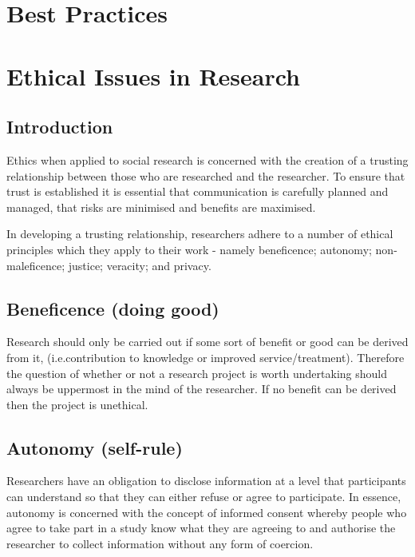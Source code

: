 \section{Best Practices}

\section{Ethical Issues in Research}

\subsection{Introduction}

Ethics when applied to social research is concerned with the creation of a trusting relationship between those who are researched and the researcher. To ensure that trust is established it is essential that communication is carefully planned and managed, that risks are minimised and benefits are maximised.\cite{kirklees2019ethical}

In developing a trusting relationship, researchers adhere to a number of ethical principles which they apply to their work - namely beneficence; autonomy; non-maleficence; justice; veracity; and privacy.

\subsection{Beneficence (doing good)}

Research should only be carried out if some sort of benefit or good can be derived from it, (i.e.contribution to knowledge or improved service/treatment). Therefore the question of whether or not a research project is worth undertaking should always be uppermost in the mind of the researcher. If no benefit can be derived then the project is unethical.

\subsection{Autonomy (self-rule)}

Researchers have an obligation to disclose information at a level that participants can understand so that they can either refuse or agree to participate. In essence, autonomy is concerned with the concept of informed consent whereby people who agree to take part in a study know what they are agreeing to and authorise the researcher to collect information without any form of coercion.

